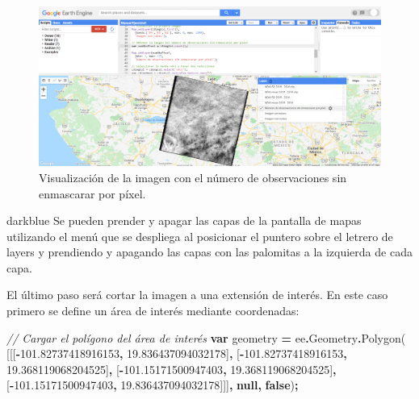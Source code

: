 \documentclass[
  12pt,
  letterpaper,
  twoside]{book}
\newenvironment{Shaded}{\begin{snugshade}}{\end{snugshade}}
\newcommand{\AttributeTok}[1]{\textcolor[rgb]{0.77,0.63,0.00}{#1}}
\newcommand{\CommentTok}[1]{\textcolor[rgb]{0.56,0.35,0.01}{\textit{#1}}}
\newcommand{\FloatTok}[1]{\textcolor[rgb]{0.00,0.00,0.81}{#1}}
\newcommand{\FunctionTok}[1]{\textcolor[rgb]{0.00,0.00,0.00}{#1}}
\newcommand{\KeywordTok}[1]{\textcolor[rgb]{0.13,0.29,0.53}{\textbf{#1}}}
\newcommand{\NormalTok}[1]{#1}
\newcommand{\OperatorTok}[1]{\textcolor[rgb]{0.81,0.36,0.00}{\textbf{#1}}}
\begin{document}
\begin{figure}[btp]

{\centering \includegraphics[width=1\linewidth]{Img/imCount} 

}

\caption{Visualización de la imagen con el número de observaciones sin enmascarar por píxel.}\label{fig:unnamed-chunk-174}
\end{figure}

\begin{bluebox2}

\begin{awesomeblock}{5pt}{\faLightbulb}{darkblue}
Se pueden prender y apagar las capas de la pantalla de mapas utilizando el menú que se despliega al posicionar el puntero sobre el letrero de layers y prendiendo y apagando las capas con las palomitas a la izquierda de cada capa.

\end{awesomeblock}

\end{bluebox2}

El último paso será cortar la imagen a una extensión de interés. En este caso primero se define un área de interés mediante coordenadas:

\begin{Shaded}
\begin{Highlighting}[]
\CommentTok{// Cargar el polígono del área de interés}
\KeywordTok{var}\NormalTok{ geometry }\OperatorTok{=}\NormalTok{ ee}\OperatorTok{.}\AttributeTok{Geometry}\OperatorTok{.}\FunctionTok{Polygon}\NormalTok{(}
\NormalTok{        [[[}\OperatorTok{{-}}\FloatTok{101.82737418916153}\OperatorTok{,} \FloatTok{19.836437094032178}\NormalTok{]}\OperatorTok{,}
\NormalTok{          [}\OperatorTok{{-}}\FloatTok{101.82737418916153}\OperatorTok{,} \FloatTok{19.368119068204525}\NormalTok{]}\OperatorTok{,}
\NormalTok{          [}\OperatorTok{{-}}\FloatTok{101.15171500947403}\OperatorTok{,} \FloatTok{19.368119068204525}\NormalTok{]}\OperatorTok{,}
\NormalTok{          [}\OperatorTok{{-}}\FloatTok{101.15171500947403}\OperatorTok{,} \FloatTok{19.836437094032178}\NormalTok{]]]}\OperatorTok{,} \KeywordTok{null}\OperatorTok{,} \KeywordTok{false}\NormalTok{)}\OperatorTok{;}
\end{Highlighting}
\end{Shaded}
\end{document}
